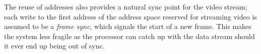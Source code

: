 The reuse of addresses also provides a natural sync point for the video stream;
each write to the first address of the address space reserved for streaming video is assumed to be a \textit{frame sync}, which signals the start of a new frame.
This makes the system less fragile as the processor can catch up with the data stream should it ever end up being out of sync.
